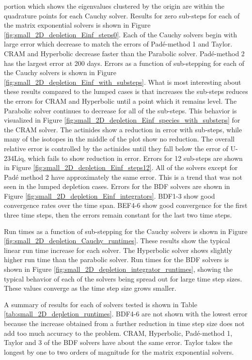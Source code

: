 \noindent portion which shows the eigenvalues clustered by the origin are within the quadrature points for each Cauchy solver. Results for zero sub-steps for each of the matrix exponential solvers is shown in Figure \ref{fig:small_2D_depletion_Einf_steps0}. Each of the Cauchy solvers begin with large error which decrease to match the errors of Pad\'e-method 1 and Taylor. CRAM and Hyperbolic decrease faster than the Parabolic solver. Pad\'e-method 2 has the largest error at 200 days. Errors as a function of sub-stepping for each of the Cauchy solvers is shown in Figure \ref{fig:small_2D_depletion_Einf_with_substeps}. What is most interesting about these results compared to the lumped cases is that increases the sub-steps reduces the errors for CRAM and Hyperbolic until a point which it remains level. The Parabolic solver continues to decrease for all of the sub-steps. This behavior is visualized in Figure \ref{fig:small_2D_depletion_Einf_species_with_substeps} for the CRAM solver. The actinides show a reduction in error with sub-steps, while many of the isotopes in the middle of the plot show no reduction. The overall relative error is controlled by the actinides until they fall below the error of U-234Liq, which fails to show reduction in error. Errors for 12 sub-steps are shown in Figure \ref{fig:small_2D_depletion_Einf_steps12}. All of the solvers except for Pad\'e method 2 have approximately the same error. This is a trend that was not seen in the lumped depletion cases. Errors for the BDF solvers are shown in Figure \ref{fig:small_2D_depletion_Einf_integrators}. BDF1-3 show good convergence rates over the time span. BEF4-6 show good convergence for the first three time steps, then the errors remain constant for the last two time steps. 

Run times as a function of sub-stepping for the Cauchy solvers is shown in Figure \ref{fig:small_2D_depletion_Cauchy_runtimes}. These results show the typical linear run time increase for each solver. The Hyperbolic solver shows slightly higher run time than the parabolic solver. Run times for the BDF solvers is shown in Figure \ref{fig:small_2D_depletion_integrator_runtimes}, showing the typical behavior of each of the solvers being spread out for large time step sizes. These values converge as the time step size grows smaller. 

A summary of results for each of solvers tested is shown in Table \ref{tab:small_2D_depletion_runtimes}. BDF4-6 are not shown with the lowest error because the increase obtained from a further reduction in time step size does not add too much accuracy to the problem. CRAM, Hyperbolic, Pad\'e-method 1, Taylor and 3 of the BDF solvers have about the same error. Taylor takes the longest by one to two orders of magnitude for the matrix exponential solvers. 
\clearpage

